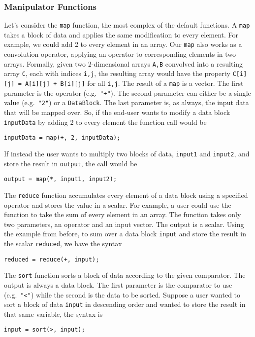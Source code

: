 \documentclass[twocolumn]{article}
\renewcommand{\|}{\origbar} %
\newcommand{\code}[1]{\texttt{#1}}
\begin{document}
\subsubsection{Manipulator Functions}
\label{sec:manipulators}

Let's consider the \code{map} function, the most complex of the default functions. A \code{map} takes a block of data and applies the same modification to every element. For example, we could add 2 to every element in an array. Our \code{map} also works as a convolution operator, applying an operator to corresponding elements in two arrays. Formally, given two 2-dimensional arrays \code{A,B} convolved into a resulting array \code{C}, each with indices \code{i,j}, the resulting array would have the property \code{C[i][j]~=~A[i][j]~+~B[i][j]} for all \code{i,j}. The result of a \code{map} is a vector. The first parameter is the operator (e.g.\ \code{"+"}). The second parameter can either be a single value (e.g.\ \code{"2"}) or a \code{DataBlock}. The last parameter is, as always, the input data that will be mapped over. So, if the end-user wants to modify a data block \code{inputData} by adding 2 to every element the function call would be
\begin{center}
  \code{inputData = map(+, 2, inputData);}
\end{center}
If instead the user wants to multiply two blocks of data, \code{input1} and \code{input2}, and store the result in \code{output}, the call would be
\begin{center}
  \code{output = map(*, input1, input2);}
\end{center}

The \code{reduce} function accumulates every element of a data block using a specified operator and stores the value in a scalar. For example, a user could use the function to take the sum of every element in an array. The function takes only two parameters, an operator and an input vector. The output is a scalar. Using the example from before, to sum over a data block \code{input} and store the result in the scalar \code{reduced}, we have the syntax
\begin{center}
  \code{reduced = reduce(+, input);}
\end{center}

The \code{sort} function sorts a block of data according to the given comparator. The output is always a data block. The first parameter is the comparator to use (e.g.\ \code{"<"}) while the second is the data to be sorted. Suppose a user wanted to sort a block of data \code{input} in descending order and wanted to store the result in that same variable, the syntax is
\begin{center}
  \code{input = sort(>, input);}
\end{center}
\end{document}

